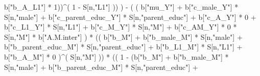 \documentclass[
]{book}
\newenvironment{Shaded}{\begin{snugshade}}{\end{snugshade}}
\newcommand{\DecValTok}[1]{\textcolor[rgb]{0.00,0.00,0.81}{#1}}
\newcommand{\NormalTok}[1]{#1}
\newcommand{\SpecialCharTok}[1]{\textcolor[rgb]{0.00,0.00,0.00}{#1}}
\newcommand{\StringTok}[1]{\textcolor[rgb]{0.31,0.60,0.02}{#1}}
\begin{document}
\begin{Shaded}
\begin{Highlighting}[]
\NormalTok{                                   b[}\StringTok{"b\_A\_L1"}\NormalTok{] }\SpecialCharTok{*} \DecValTok{1}\NormalTok{))}\SpecialCharTok{\^{}}\NormalTok{( }\DecValTok{1} \SpecialCharTok{{-}}\NormalTok{ S[n,}\StringTok{"L1"}\NormalTok{] )) ) }\SpecialCharTok{{-}} 
\NormalTok{                      ( ( b[}\StringTok{"mu\_Y"}\NormalTok{] }\SpecialCharTok{+} 
\NormalTok{                            b[}\StringTok{"c\_male\_Y"}\NormalTok{] }\SpecialCharTok{*}\NormalTok{ S[n,}\StringTok{"male"}\NormalTok{] }\SpecialCharTok{+} 
\NormalTok{                            b[}\StringTok{"c\_parent\_educ\_Y"}\NormalTok{] }\SpecialCharTok{*}\NormalTok{ S[n,}\StringTok{"parent\_educ"}\NormalTok{] }\SpecialCharTok{+}
\NormalTok{                            b[}\StringTok{"c\_A\_Y"}\NormalTok{] }\SpecialCharTok{*} \DecValTok{0} \SpecialCharTok{+}
\NormalTok{                            b[}\StringTok{"c\_L1\_Y"}\NormalTok{] }\SpecialCharTok{*}\NormalTok{ S[n,}\StringTok{"L1"}\NormalTok{] }\SpecialCharTok{+}
\NormalTok{                            b[}\StringTok{"c\_M\_Y"}\NormalTok{] }\SpecialCharTok{*}\NormalTok{ S[n,}\StringTok{"M"}\NormalTok{] }\SpecialCharTok{+} 
\NormalTok{                            b[}\StringTok{"c\_AM\_Y"}\NormalTok{] }\SpecialCharTok{*} \DecValTok{0} \SpecialCharTok{*}\NormalTok{ S[n,}\StringTok{"M"}\NormalTok{] }\SpecialCharTok{*}\NormalTok{ b[}\StringTok{"A.M.inter"}\NormalTok{] ) }\SpecialCharTok{*}
\NormalTok{                          (( b[}\StringTok{"b\_M"}\NormalTok{] }\SpecialCharTok{+} 
\NormalTok{                               b[}\StringTok{"b\_male\_M"}\NormalTok{] }\SpecialCharTok{*}\NormalTok{ S[n,}\StringTok{"male"}\NormalTok{] }\SpecialCharTok{+} 
\NormalTok{                               b[}\StringTok{"b\_parent\_educ\_M"}\NormalTok{] }\SpecialCharTok{*}\NormalTok{ S[n,}\StringTok{"parent\_educ"}\NormalTok{] }\SpecialCharTok{+} 
\NormalTok{                               b[}\StringTok{"b\_L1\_M"}\NormalTok{] }\SpecialCharTok{*}\NormalTok{ S[n,}\StringTok{"L1"}\NormalTok{] }\SpecialCharTok{+}
\NormalTok{                               b[}\StringTok{"b\_A\_M"}\NormalTok{] }\SpecialCharTok{*} \DecValTok{0}\NormalTok{ )}\SpecialCharTok{\^{}}\NormalTok{( S[n,}\StringTok{"M"}\NormalTok{] )) }\SpecialCharTok{*}
\NormalTok{                          (( }\DecValTok{1} \SpecialCharTok{{-}}\NormalTok{ (b[}\StringTok{"b\_M"}\NormalTok{] }\SpecialCharTok{+} 
\NormalTok{                                    b[}\StringTok{"b\_male\_M"}\NormalTok{] }\SpecialCharTok{*}\NormalTok{ S[n,}\StringTok{"male"}\NormalTok{] }\SpecialCharTok{+} 
\NormalTok{                                    b[}\StringTok{"b\_parent\_educ\_M"}\NormalTok{] }\SpecialCharTok{*}\NormalTok{ S[n,}\StringTok{"parent\_educ"}\NormalTok{] }\SpecialCharTok{+} 

\end{Highlighting}
\end{Shaded}
\end{document}
